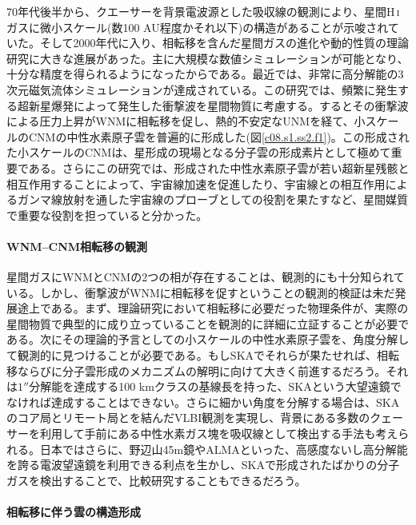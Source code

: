 70年代後半から、クエーサーを背景電波源とした吸収線の観測により、星間H\,\textsc{i}ガスに微小スケール(数100 AU程度かそれ以下)の構造があることが示唆されていた\citep{1976ApJ...206L.113D}。そして2000年代に入り、相転移を含んだ星間ガスの進化や動的性質の理論研究に大きな進展があった\citep{2000ApJ...532..980K, 2002ApJ...564L..97K}。主に大規模な数値シミュレーションが可能となり、十分な精度を得られるようになったからである。最近では、非常に高分解能の3次元磁気流体シミュレーションが達成されている\citep{2012ApJ...759...35I,2012ApJ...744...71I}。この研究では、頻繁に発生する超新星爆発によって発生した衝撃波を星間物質に考慮する。するとその衝撃波による圧力上昇がWNMに相転移を促し、熱的不安定なUNMを経て、小スケールのCNMの中性水素原子雲を普遍的に形成した(図\ref{c08.s1.ss2.f1})。この形成された小スケールのCNMは、星形成の現場となる分子雲の形成素片として極めて重要である。さらにこの研究では、形成された中性水素原子雲が若い超新星残骸と相互作用することによって、宇宙線加速を促進したり、宇宙線との相互作用によるガンマ線放射を通した宇宙線のプローブとしての役割を果たすなど、星間媒質で重要な役割を担っていると分かった。

\paragraph{WNM--CNM相転移の観測}

星間ガスにWNMとCNMの2つの相が存在することは、観測的にも十分知られている。しかし、衝撃波がWNMに相転移を促すということの観測的検証は未だ発展途上である。まず、理論研究において相転移に必要だった物理条件が、実際の星間物質で典型的に成り立っていることを観測的に詳細に立証することが必要である。次にその理論的予言としての小スケールの中性水素原子雲を、角度分解して観測的に見つけることが必要である。もしSKAでそれらが果たせれば、相転移ならびに分子雲形成のメカニズムの解明に向けて大きく前進するだろう。それは$1''$分解能を達成する100 kmクラスの基線長を持った、SKAという大望遠鏡でなければ達成することはできない。さらに細かい角度を分解する場合は、SKAのコア局とリモート局とを結んだVLBI観測を実現し、背景にある多数のクェーサーを利用して手前にある中性水素ガス塊を吸収線として検出する手法も考えられる\citep{1996MNRAS.283.1105D}。日本ではさらに、野辺山45m鏡やALMAといった、高感度ないし高分解能を誇る電波望遠鏡を利用できる利点を生かし、SKAで形成されたばかりの分子ガスを検出することで、比較研究することもできるだろう。

\paragraph{相転移に伴う雲の構造形成}

